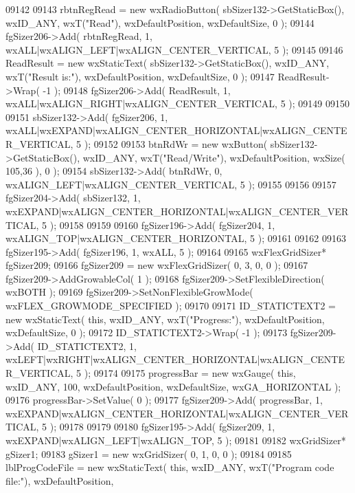 \begin{DoxyCode}
09142     
09143     rbtnRegRead = \textcolor{keyword}{new} wxRadioButton( sbSizer132->GetStaticBox(), wxID\_ANY, wxT(\textcolor{stringliteral}{"Read"}), wxDefaultPosition, 
      wxDefaultSize, 0 );
09144     fgSizer206->Add( rbtnRegRead, 1, wxALL|wxALIGN\_LEFT|wxALIGN\_CENTER\_VERTICAL, 5 );
09145     
09146     ReadResult = \textcolor{keyword}{new} wxStaticText( sbSizer132->GetStaticBox(), wxID\_ANY, wxT(\textcolor{stringliteral}{"Result is:"}), 
      wxDefaultPosition, wxDefaultSize, 0 );
09147     ReadResult->Wrap( -1 );
09148     fgSizer206->Add( ReadResult, 1, wxALL|wxALIGN\_RIGHT|wxALIGN\_CENTER\_VERTICAL, 5 );
09149     
09150     
09151     sbSizer132->Add( fgSizer206, 1, wxALL|wxEXPAND|wxALIGN\_CENTER\_HORIZONTAL|wxALIGN\_CENTER\_VERTICAL, 5 );
09152     
09153     btnRdWr = \textcolor{keyword}{new} wxButton( sbSizer132->GetStaticBox(), wxID\_ANY, wxT(\textcolor{stringliteral}{"Read/Write"}), wxDefaultPosition, 
      wxSize( 105,36 ), 0 );
09154     sbSizer132->Add( btnRdWr, 0, wxALIGN\_LEFT|wxALIGN\_CENTER\_VERTICAL, 5 );
09155     
09156     
09157     fgSizer204->Add( sbSizer132, 1, wxEXPAND|wxALIGN\_CENTER\_HORIZONTAL|wxALIGN\_CENTER\_VERTICAL, 5 );
09158     
09159     
09160     fgSizer196->Add( fgSizer204, 1, wxALIGN\_TOP|wxALIGN\_CENTER\_HORIZONTAL, 5 );
09161     
09162     
09163     fgSizer195->Add( fgSizer196, 1, wxALL, 5 );
09164     
09165     wxFlexGridSizer* fgSizer209;
09166     fgSizer209 = \textcolor{keyword}{new} wxFlexGridSizer( 0, 3, 0, 0 );
09167     fgSizer209->AddGrowableCol( 1 );
09168     fgSizer209->SetFlexibleDirection( wxBOTH );
09169     fgSizer209->SetNonFlexibleGrowMode( wxFLEX\_GROWMODE\_SPECIFIED );
09170     
09171     ID_STATICTEXT2 = \textcolor{keyword}{new} wxStaticText( \textcolor{keyword}{this}, wxID\_ANY, wxT(\textcolor{stringliteral}{"Progress:"}), wxDefaultPosition, wxDefaultSize, 
      0 );
09172     ID_STATICTEXT2->Wrap( -1 );
09173     fgSizer209->Add( ID_STATICTEXT2, 1, wxLEFT|wxRIGHT|wxALIGN\_CENTER\_HORIZONTAL|wxALIGN\_CENTER\_VERTICAL, 5
       );
09174     
09175     progressBar = \textcolor{keyword}{new} wxGauge( \textcolor{keyword}{this}, wxID\_ANY, 100, wxDefaultPosition, wxDefaultSize, wxGA\_HORIZONTAL );
09176     progressBar->SetValue( 0 ); 
09177     fgSizer209->Add( progressBar, 1, wxEXPAND|wxALIGN\_CENTER\_HORIZONTAL|wxALIGN\_CENTER\_VERTICAL, 5 );
09178     
09179     
09180     fgSizer195->Add( fgSizer209, 1, wxEXPAND|wxALIGN\_LEFT|wxALIGN\_TOP, 5 );
09181     
09182     wxGridSizer* gSizer1;
09183     gSizer1 = \textcolor{keyword}{new} wxGridSizer( 0, 1, 0, 0 );
09184     
09185     lblProgCodeFile = \textcolor{keyword}{new} wxStaticText( \textcolor{keyword}{this}, wxID\_ANY, wxT(\textcolor{stringliteral}{"Program code file:"}), wxDefaultPosition, 

\end{DoxyCode}
